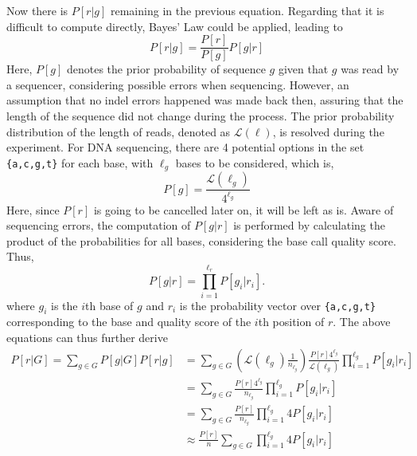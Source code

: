 \documentclass{PHlab-thesis}
\begin{document}
Now there is $P[r|g]$ remaining in the previous equation. Regarding that it is difficult to compute directly, Bayes' Law could be applied, leading to
\begin{equation}
P[r|g] = \frac{P[r]}{P[g]} P[g|r]
\end{equation}
Here, $P[g]$ denotes the prior probability of sequence $g$ given that $g$ was read by a sequencer, considering possible errors when sequencing. However, an assumption that no indel errors happened was made back then, assuring that the length of the sequence did not change during the process. The prior probability distribution of the length of reads, denoted as $\mathcal{L}(\ell)$, is resolved during the experiment. For DNA sequencing, there are 4 potential options in the set \texttt{\{a,c,g,t\}} for each base, with $\ell_g$ bases to be considered, which is,
\begin{equation}
P[g] =  \frac{\mathcal{L}(\ell_g)}{4^{\ell_g}}
\end{equation}
Here, since $P[r]$ is going to be cancelled later on, it will be left as is. Aware of sequencing errors, the computation of $P[g|r]$ is performed by calculating the product of the probabilities for all bases, considering the base call quality score. Thus,
\begin{equation}
P[g|r] = \prod_{i=1}^{\ell_r} P[g_i|r_i].
\end{equation}
where $g_i$ is the $i$th base of $g$ and $r_i$ is the probability vector over \texttt{\{a,c,g,t\}} corresponding to the base and quality score of the $i$th position of $r$. The above equations can thus further derive
\begin{equation*}
\begin{split}
P[r|G] =  \sum_{g\in G} P[g|G] P[r|g] &= \sum_{g\in G} \left( \mathcal{L}(\ell_g) \frac{1}{n_{\ell_g}} \right) \frac{P[r]4^{\ell_g}}{\mathcal{L}(\ell_g)} \prod_{i=1}^{\ell_g} P[g_i|r_i]  \\
                                      &= \sum_{g\in G} \frac{P[r]4^{\ell_g}}{n_{\ell_g}} \prod_{i=1}^{\ell_g} P[g_i|r_i]  \\
                                      &= \sum_{g\in G} \frac{P[r]}{n_{\ell_g}} \prod_{i=1}^{\ell_g} 4P[g_i|r_i]  \\
                                      &\approx \frac{P[r]}{n} \sum_{g\in G} \prod_{i=1}^{\ell_g} 4P[g_i|r_i]  \\
\end{split}
\end{equation*}
\end{document}
